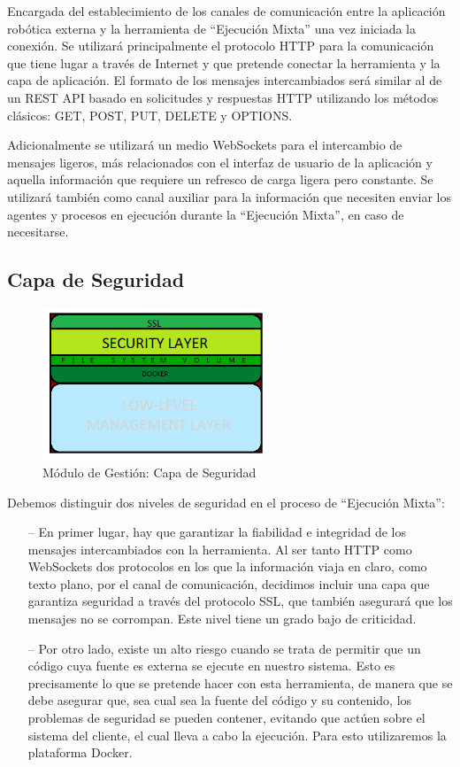 Encargada del establecimiento de los canales de comunicación entre la aplicación robótica externa y la herramienta de ``Ejecución Mixta'' una vez iniciada la conexión. Se utilizará principalmente el protocolo HTTP para la comunicación que tiene lugar a través de Internet y que pretende conectar la herramienta y la capa de aplicación. El formato de los mensajes intercambiados será similar al de un REST API basado en solicitudes y respuestas HTTP utilizando los métodos clásicos: GET, POST, PUT, DELETE y OPTIONS.

Adicionalmente se utilizará un medio WebSockets para el intercambio de mensajes ligeros, más relacionados con el interfaz de usuario de la aplicación y aquella información que requiere un refresco de carga ligera pero constante. Se utilizará también como canal auxiliar para la información que necesiten enviar los agentes y procesos en ejecución durante la ``Ejecución Mixta'', en caso de necesitarse.

\subsection{Capa de Seguridad}

\begin{figure}[!hbtp]  \centering\noindent
    \includegraphics[width=0.6\textwidth]{figures/layer2.png}
    \caption{Módulo de Gestión: Capa de Seguridad}
    \label{layer2}
\end{figure}

Debemos distinguir dos niveles de seguridad en el proceso de ``Ejecución Mixta'':

\begin{itemize}
    \item [--] En primer lugar, hay que garantizar la fiabilidad e integridad de los mensajes intercambiados con la herramienta. Al ser tanto HTTP como WebSockets dos protocolos en los que la información viaja en claro, como texto plano, por el canal de comunicación, decidimos incluir una capa que garantiza seguridad a través del protocolo SSL, que también asegurará que los mensajes no se corrompan. Este nivel tiene un grado bajo de criticidad.
    \item [--] Por otro lado, existe un alto riesgo cuando se trata de permitir que un código cuya fuente es externa se ejecute en nuestro sistema. Esto es precisamente lo que se pretende hacer con esta herramienta, de manera que se debe asegurar que, sea cual sea la fuente del código y su contenido, los problemas de seguridad se pueden contener, evitando que actúen sobre el sistema del cliente, el cual lleva a cabo la ejecución. Para esto utilizaremos la plataforma Docker.
\end{itemize}

